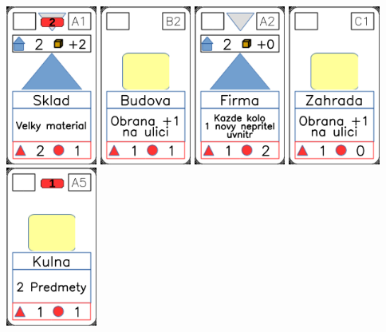 \documentclass[a4paper]{article}
\begin{document}
	\includegraphics[width=3.0cm]{img-3_15}
	\includegraphics[width=3.0cm]{img-2_6}
	\includegraphics[width=3.0cm]{img-3_16}
	\includegraphics[width=3.0cm]{img-2_25}
	\includegraphics[width=3.0cm]{img-2_19}
\end{document}
